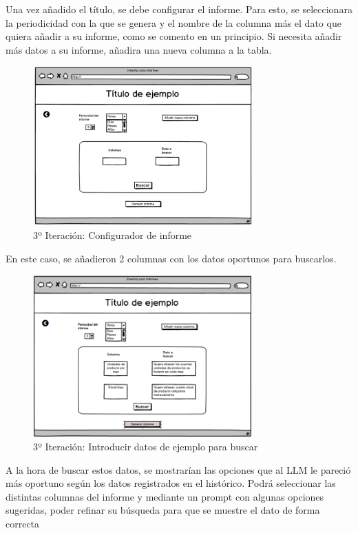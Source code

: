 Una vez añadido el título, se debe configurar el informe. Para esto, se seleccionara la periodicidad con la que se genera 
y el nombre de la columna más el dato que quiera añadir a su informe, como se comento en un principio. 
Si necesita añadir más datos a su informe, añadira una nueva columna a la tabla.

\begin{figure}[hp!]
    \centering
    \includegraphics[width=0.75\textwidth]{imaxes/iteracion3.2.png}
    \caption{3º Iteración: Configurador de informe}
    \label{fig:iteracion3.2}
\end{figure}

En este caso, se añadieron 2 columnas con los datos oportunos para buscarlos.

\begin{figure}[hp!]
    \centering
    \includegraphics[width=0.75\textwidth]{imaxes/iteracion3.3.png}
    \caption{3º Iteración: Introducir datos de ejemplo para buscar}
    \label{fig:iteracion3.3}
\end{figure}

A la hora de buscar estos datos, se mostrarían las opciones que al LLM le pareció más oportuno según los 
datos registrados en el histórico. Podrá seleccionar las distintas columnas del informe y mediante un prompt 
con algunas opciones sugeridas, poder refinar su búsqueda para que se muestre el dato de forma correcta

